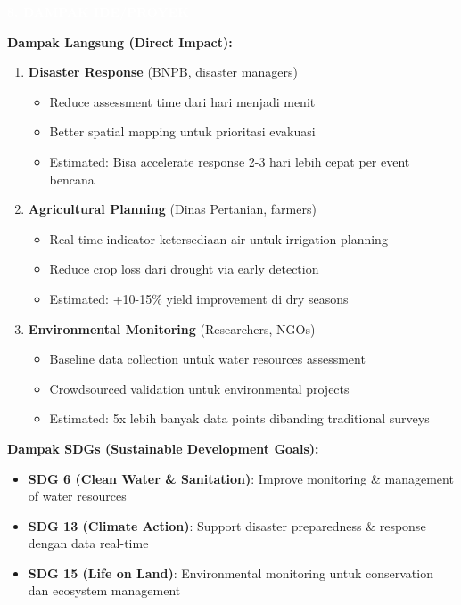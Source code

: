 \documentclass[12pt,a4paper]{article}
\newcommand{\sectionbox}[1]{%
  \colorbox{samsungblue}{%
    \parbox{\textwidth}{%
      \textcolor{white}{\large\bfseries #1}%
    }%
  }%
}
\newcommand{\subsectionbox}[1]{%
  \textbf{\large #1}\\[0.3cm]
}
\begin{document}
\vspace{1cm}

\sectionbox{8. DAMPAK IDE/PROYEK}

\vspace{0.5cm}

\subsectionbox{Dampak Langsung (Direct Impact):}

\begin{enumerate}
  \item \textbf{Disaster Response} (BNPB, disaster managers)
  \begin{itemize}
    \item Reduce assessment time dari hari menjadi menit
    \item Better spatial mapping untuk prioritasi evakuasi
    \item Estimated: Bisa accelerate response 2-3 hari lebih cepat per event bencana
  \end{itemize}

  \item \textbf{Agricultural Planning} (Dinas Pertanian, farmers)
  \begin{itemize}
    \item Real-time indicator ketersediaan air untuk irrigation planning
    \item Reduce crop loss dari drought via early detection
    \item Estimated: +10-15\% yield improvement di dry seasons
  \end{itemize}

  \item \textbf{Environmental Monitoring} (Researchers, NGOs)
  \begin{itemize}
    \item Baseline data collection untuk water resources assessment
    \item Crowdsourced validation untuk environmental projects
    \item Estimated: 5x lebih banyak data points dibanding traditional surveys
  \end{itemize}
\end{enumerate}

\subsectionbox{Dampak SDGs (Sustainable Development Goals):}

\begin{itemize}
  \item \textbf{SDG 6 (Clean Water \& Sanitation)}: Improve monitoring \& management of water resources
  \item \textbf{SDG 13 (Climate Action)}: Support disaster preparedness \& response dengan data real-time
  \item \textbf{SDG 15 (Life on Land)}: Environmental monitoring untuk conservation dan ecosystem management
\end{itemize}
\end{document}
